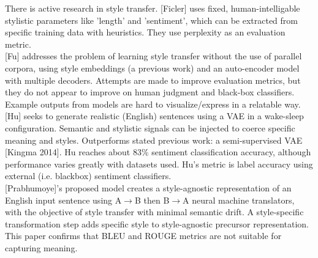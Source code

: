 \documentclass[letterpaper, 10 pt, conference]{ieeeconf}  %
\begin{document}
There is active research in style transfer. [Ficler] uses fixed, human-intelligable stylistic parameters like ’length’ and ’sentiment’, which can be extracted from specific training data with heuristics. They use perplexity as an evaluation metric.
\\ 

[Fu] addresses the problem of learning style transfer without the use of parallel corpora, using style embeddings (a previous work) and an auto-encoder model with multiple decoders. Attempts are made to improve evaluation metrics, but they do not appear to improve on human judgment and black-box classifiers. Example outputs from models are hard to visualize/express in a relatable way.
\\ 

[Hu] seeks to generate realistic (English) sentences using a VAE in a wake-sleep configuration. Semantic and stylistic signals can be injected to coerce specific meaning and styles.
Outperforms stated previous work: a semi-supervised VAE [Kingma 2014]. Hu reaches about 83\% sentiment classification accuracy, although performance varies greatly with datasets used. Hu's metric is label accuracy using external (i.e. blackbox) sentiment classifiers.
\\ 

[Prabhumoye]'s proposed model creates a style-agnostic representation of an English input sentence using A$\rightarrow$B then B$\rightarrow$A neural machine translators, with the objective of style transfer with minimal semantic drift. A style-specific transformation step adds specific style to style-agnostic precursor representation. This paper confirms that BLEU and ROUGE metrics are not suitable for capturing meaning.
\end{document}
